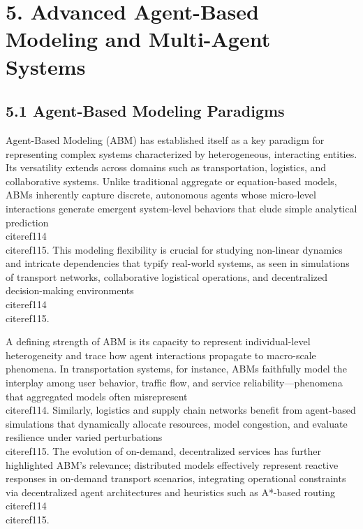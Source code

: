 \documentclass[11pt]{article}
\begin{document}
\section{5. Advanced Agent-Based Modeling and Multi-Agent Systems}

\subsection{5.1 Agent-Based Modeling Paradigms}

Agent-Based Modeling (ABM) has established itself as a key paradigm for representing complex systems characterized by heterogeneous, interacting entities. Its versatility extends across domains such as transportation, logistics, and collaborative systems. Unlike traditional aggregate or equation-based models, ABMs inherently capture discrete, autonomous agents whose micro-level interactions generate emergent system-level behaviors that elude simple analytical prediction~\\cite{ref114}\\cite{ref115}. This modeling flexibility is crucial for studying non-linear dynamics and intricate dependencies that typify real-world systems, as seen in simulations of transport networks, collaborative logistical operations, and decentralized decision-making environments~\\cite{ref114}\\cite{ref115}.

A defining strength of ABM is its capacity to represent individual-level heterogeneity and trace how agent interactions propagate to macro-scale phenomena. In transportation systems, for instance, ABMs faithfully model the interplay among user behavior, traffic flow, and service reliability—phenomena that aggregated models often misrepresent~\\cite{ref114}. Similarly, logistics and supply chain networks benefit from agent-based simulations that dynamically allocate resources, model congestion, and evaluate resilience under varied perturbations~\\cite{ref115}. The evolution of on-demand, decentralized services has further highlighted ABM’s relevance; distributed models effectively represent reactive responses in on-demand transport scenarios, integrating operational constraints via decentralized agent architectures and heuristics such as A*-based routing~\\cite{ref114}\\cite{ref115}.
\end{document}

